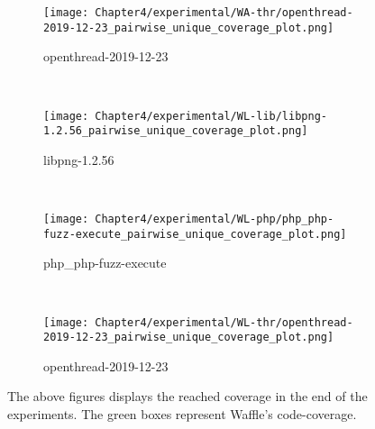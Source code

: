 \begin{figure}[!t]
\begin{adjustbox}{center,max width=1.3\textwidth}
\begin{subfigure}[t]{0.55\textwidth}
            \texttt{[image: Chapter4/experimental/WA-thr/openthread-2019-12-23\_pairwise\_unique\_coverage\_plot.png]}
            \vspace*{-5mm}
            \caption{openthread-2019-12-23}
            \label{unq:e}
            \vspace*{5mm}
        \end{subfigure}
        ~
        \begin{subfigure}[t]{0.55\textwidth}
            \centering
            \texttt{[image: Chapter4/experimental/WL-lib/libpng-1.2.56\_pairwise\_unique\_coverage\_plot.png]}
            \vspace*{-5mm}
            \caption{libpng-1.2.56}
            \label{unq:f}
            \vspace*{5mm}
        \end{subfigure}
    \end{adjustbox}
    ~
    \begin{adjustbox}{center,max width=1.3\textwidth}
        \begin{subfigure}[t]{0.55\textwidth}
            \centering
            \texttt{[image: Chapter4/experimental/WL-php/php\_php-fuzz-execute\_pairwise\_unique\_coverage\_plot.png]}
            \vspace*{-5mm}
            \caption{php\_php-fuzz-execute}
            \label{unq:g}
            \vspace*{5mm}
        \end{subfigure}
        ~
        \begin{subfigure}[t]{0.55\textwidth}
            \centering
            \texttt{[image: Chapter4/experimental/WL-thr/openthread-2019-12-23\_pairwise\_unique\_coverage\_plot.png]}
            \vspace*{-5mm}
            \caption{openthread-2019-12-23}
            \label{unq:h}
            \vspace*{5mm}
        \end{subfigure}
    \end{adjustbox}
    \caption{The above figures displays the reached coverage in the end of the experiments. The green boxes represent Waffle's code-coverage.}
    \label{fig:report-unq}
\end{figure}

